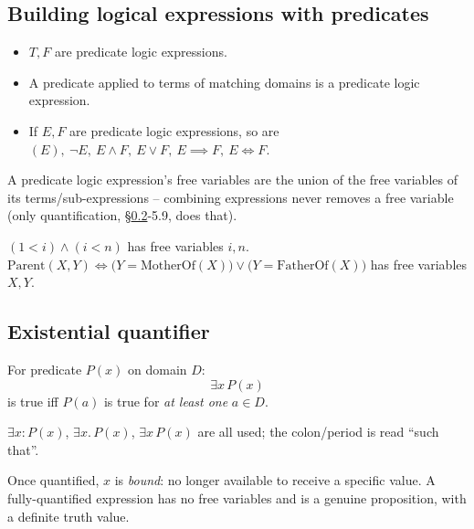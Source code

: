 \subsection{Building logical expressions with predicates}
\label{sec:5-5}

\begin{definition}
\begin{itemize}
    \item $T, F$ are predicate logic expressions.
    \item A predicate applied to terms of matching domains is a predicate logic expression.
    \item If $E,F$ are predicate logic expressions, so are $(E),\ \neg E,\ E\wedge F,\ E\vee F,\ E\implies F,\ E\iff F$.
\end{itemize}
\end{definition}

\begin{note}
A predicate logic expression's free variables are the union of the free variables of its terms/sub-expressions -- combining expressions never removes a free variable (only quantification, \S\ref{sec:5-6}-5.9, does that).
\end{note}

\begin{example}
$(1<i)\wedge(i<n)$ has free variables $i,n$. $\mathrm{Parent}(X,Y)\iff\big(Y=\mathrm{MotherOf}(X)\big)\vee\big(Y=\mathrm{FatherOf}(X)\big)$ has free variables $X,Y$.
\end{example}

\subsection{Existential quantifier}
\label{sec:5-6}

\begin{definition}
For predicate $P(x)$ on domain $D$:
\[
\exists x\, P(x)
\]
is true iff $P(a)$ is true for \emph{at least one} $a\in D$.
\end{definition}

\begin{note}[Punctuation]
$\exists x : P(x)$, $\exists x.\, P(x)$, $\exists x\, P(x)$ are all used; the colon/period is read ``such that''.
\end{note}

\begin{definition}
Once quantified, $x$ is \emph{bound}: no longer available to receive a specific value. A fully-quantified expression has no free variables and is a genuine proposition, with a definite truth value.
\end{definition}

